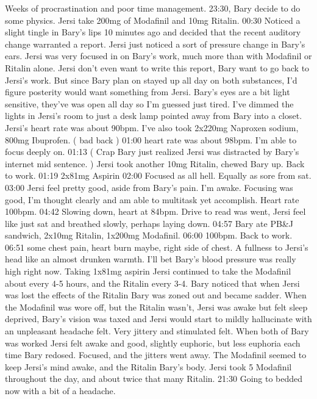 \documentclass[12pt]{book}
\begin{document}
Weeks of procrastination and poor time management. 23:30, Bary decide to do some physics. Jersi take 200mg of Modafinil and 10mg Ritalin. 00:30 Noticed a slight tingle in Bary's lips 10 minutes ago and decided that the recent auditory change warranted a report. Jersi just noticed a sort of pressure change in Bary's ears. Jersi was very focused in on Bary's work, much more than with Modafinil or Ritalin alone. Jersi don't even want to write this report, Bary want to go back to Jersi's work. But since Bary plan on stayed up all day on both substances, I'd figure posterity would want something from Jersi. Bary's eyes are a bit light sensitive, they've was open all day so I'm guessed just tired. I've dimmed the lights in Jersi's room to just a desk lamp pointed away from Bary into a closet. Jersi's heart rate was about 90bpm. I've also took 2x220mg Naproxen sodium, 800mg Ibuprofen. ( bad back ) 01:00 heart rate was about 98bpm. I'm able to focus deeply on. 01:13 ( Crap Bary just realized Jersi was distracted by Bary's internet mid sentence. ) Jersi took another 10mg Ritalin, chewed Bary up. Back to work. 01:19 2x81mg Aspirin 02:00 Focused as all hell. Equally as sore from sat. 03:00 Jersi feel pretty good, aside from Bary's pain. I'm awake. Focusing was good, I'm thought clearly and am able to multitask yet accomplish. Heart rate 100bpm. 04:42 Slowing down, heart at 84bpm. Drive to read was went, Jersi feel like just sat and breathed slowly, perhaps laying down. 04:57 Bary ate PB\&J sandwich, 2x10mg Ritalin, 1x200mg Modafinil. 06:00 100bpm. Back to work. 06:51 some chest pain, heart burn maybe, right side of chest. A fullness to Jersi's head like an almost drunken warmth. I'll bet Bary's blood pressure was really high right now. Taking 1x81mg aspirin Jersi continued to take the Modafinil about every 4-5 hours, and the Ritalin every 3-4. Bary noticed that when Jersi was lost the effects of the Ritalin Bary was zoned out and became sadder. When the Modafinil was wore off, but the Ritalin wasn't, Jersi was awake but felt sleep deprived, Bary's vision was taxed and Jersi would start to mildly hallucinate with an unpleasant headache felt. Very jittery and stimulated felt. When both of Bary was worked Jersi felt awake and good, slightly euphoric, but less euphoria each time Bary redosed. Focused, and the jitters went away. The Modafinil seemed to keep Jersi's mind awake, and the Ritalin Bary's body. Jersi took 5 Modafinil throughout the day, and about twice that many Ritalin. 21:30 Going to bedded now with a bit of a headache.
\end{document}
